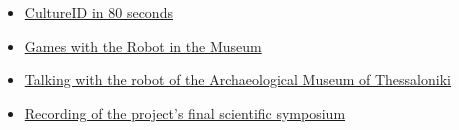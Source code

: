 \begin{itemize}
  \singlespacing
  \item \href{https://www.youtube.com/watch?v=SOA0To077WQ}{CultureID in 80 seconds}
  \item \href{https://www.youtube.com/watch?v=2EvTGNOqTrs}{Games with the Robot in the Museum}
  \item \href{https://www.youtube.com/watch?v=mrTL3Gep7Xk}{Talking with the robot of the Archaeological Museum of Thessaloniki}
  \item \href{https://www.youtube.com/watch?v=i5CUBswHWf0}{Recording of the project's final scientific symposium}
\end{itemize}
